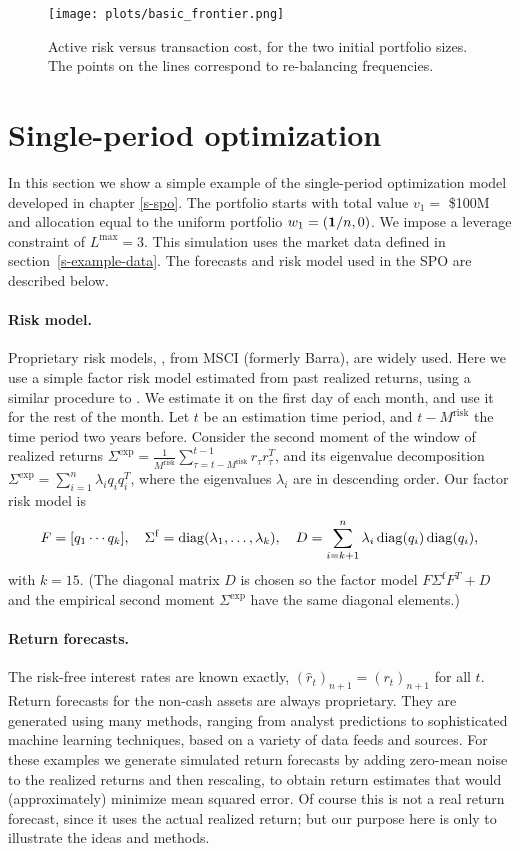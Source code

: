 \documentclass[openany]{now}
\renewcommand{\S}{section~}
\begin{document}
\begin{figure}
\begin{center}
\texttt{[image: plots/basic\_frontier.png]}
\end{center}
\caption{
Active risk
versus transaction cost, for the two initial portfolio sizes.
The points on the lines correspond to re-balancing frequencies.
}
\label{fig:basic-frontier}
\end{figure}

\section{Single-period optimization}
\label{s-example-spo}
In this section we show a simple example of the
single-period optimization model developed in chapter \ref{s-spo}.
The portfolio starts with total value $v_1 =$ \$100M and allocation
equal to the uniform portfolio $w_1 =(\mathbf 1/n,0)$.
We impose a leverage constraint of $L^\mathrm{max}=3$.
This simulation uses the market data defined in \S\ref{s-example-data}.
The forecasts and risk model used in the SPO are described below.

\paragraph{Risk model.}
Proprietary risk models, \eg,
from MSCI (formerly Barra), are widely used.
Here we use a simple factor risk model
estimated from past realized returns, using a similar
procedure to \cite{almgren09}.
We estimate it on the first day of each month, and use it for the rest of the month.
Let $t$ be an estimation time period,
and $t-M^\text{risk}$ the time period two years before.
Consider the second moment of the window of realized returns
$\Sigma^\text{exp} = \frac{1}{M^\text{risk}} \sum_{\tau = t-M^\text{risk}}^{t-1}r_{\tau}r_\tau^T$,
and its eigenvalue decomposition $\Sigma^\text{exp} = \sum_{i=1}^n \lambda_i q_i q_i^T$,
where the eigenvalues $\lambda_i$ are in descending order. Our factor risk model is
\[
F=[q_1 \cdots q_k], \quad
\Sigma^\mathrm{f} = \mathop{\rm diag}(\lambda_1, \ldots, \lambda_k), \quad
D = \sum_{i=k+1}^n \lambda_i \mathop{\rm diag}( q_i )\mathop{\rm diag}( q_i ),
\]
with $k=15$.
(The diagonal matrix $D$ is chosen so the factor model $F \Sigma^\mathrm{f} F^T + D$ and
the empirical second moment $\Sigma^\text{exp}$
have the same diagonal elements.)

\paragraph{Return forecasts.}
The risk-free interest rates are known exactly,
$(\hat r_t)_{n+1} = (r_t)_{n+1}$ for all $t$.
Return forecasts for the non-cash assets are always proprietary.
They are generated using many methods,
ranging from analyst predictions to sophisticated machine learning
techniques, based on a variety of data feeds and sources.
For these examples we generate simulated return forecasts
by  adding zero-mean noise to the realized returns
and then rescaling, to obtain return estimates that would (approximately) minimize
mean squared error.
Of course this is not a real return forecast, since it uses the actual realized return;
but our purpose here is only to illustrate the ideas and methods.
\end{document}
